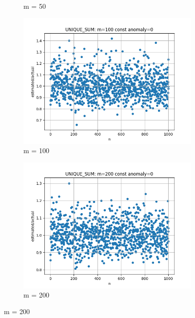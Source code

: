 \documentclass{article}
\begin{document}
\begin{figure}[H]
\begin{subfigure}{0.6\textwidth}
                \caption{m = 50}
            \end{subfigure}
            \begin{subfigure}{0.6\textwidth}
                \centering
                \includegraphics[width=\linewidth]{sum/zad1_m=100.png}
                \caption{m = 100}
            \end{subfigure}
            \begin{subfigure}{0.6\textwidth}
                \centering
                \includegraphics[width=\linewidth]{sum/zad1_m=200.png}
                \caption{m = 200}
            \end{subfigure}

\end{figure}
\end{document}
